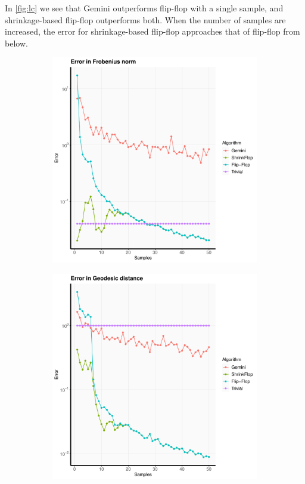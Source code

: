 \documentclass[aos]{imsart}
\theoremstyle{definition}
\numberwithin{equation}{section}
\begin{document}
In \cref{fig:lc} we see that Gemini outperforms flip-flop with a single sample, and shrinkage-based flip-flop outperforms both. When the number of samples are increased, the error for shrinkage-based flip-flop approaches that of flip-flop from below.


\begin{figure}
         \centering
                       \begin{subfigure}[b]{.4\textwidth}
         \includegraphics[width=\textwidth]{./code/zhou-comparison/25-25-spiked-lc-frob.pdf}
         \end{subfigure}
         \begin{subfigure}[b]{.4\textwidth}
         \includegraphics[width=\textwidth]{./code/zhou-comparison/25-25-spiked-lc-geo.pdf}

\end{subfigure}
\end{figure}
\end{document}
